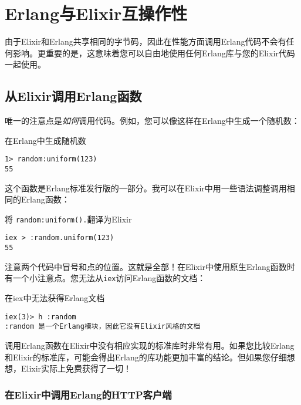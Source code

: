  \section{Erlang与Elixir互操作性}

由于Elixir和Erlang共享相同的字节码，因此在性能方面调用Erlang代码不会有任何影响。更重要的是，这意味着您可以自由地使用任何Erlang库与您的Elixir代码一起使用。

\subsection{从Elixir调用Erlang函数}

唯一的注意点是\emph{如何}调用代码。例如，您可以像这样在Erlang中生成一个随机数：

\begin{code}{在Erlang中生成随机数}
\begin{verbatim}
1> random:uniform(123)
55
\end{verbatim}
\label{lst:generate_a_random_number_in_erlang}
\end{code}

这个函数是Erlang标准发行版的一部分。我可以在Elixir中用一些语法调整调用相同的Erlang函数：


\begin{code}{将 \texttt{random:uniform().}翻译为Elixir}
\begin{verbatim}
iex > :random.uniform(123)
55
\end{verbatim}
\label{lst:use_the_random_uniform_function_in_elixir}
\end{code}

注意两个代码中冒号和点的位置。这就是全部！在Elixir中使用原生Erlang函数时有一个小注意点。您无法从\texttt{iex}访问Erlang函数的文档：

\begin{code}{在iex中无法获得Erlang文档}
\begin{verbatim}
iex(3)> h :random
:random 是一个Erlang模块，因此它没有Elixir风格的文档
\end{verbatim}
\label{lst:cannot_get_erlang_docs_in_iex}
\end{code}

调用Erlang函数在Elixir中没有相应实现的标准库时非常有用。如果您比较Erlang和Elixir的标准库，可能会得出Erlang的库功能更加丰富的结论。但如果您仔细想想，Elixir实际上免费获得了一切！


\subsubsection{在Elixir中调用Erlang的HTTP客户端}

